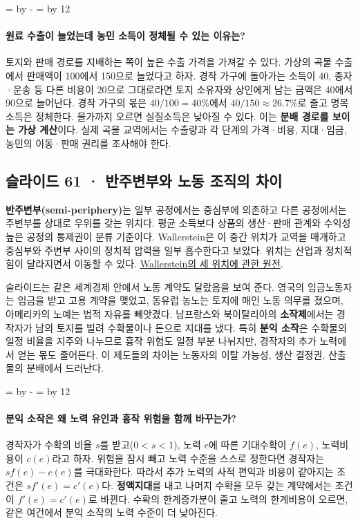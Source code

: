 \documentclass[10pt,a4paper]{article}
\newcommand{\ReserveQuestionSpace}{%
  \par\begingroup
  \dimen0=\pagegoal \advance\dimen0 by -\pagetotal
  \dimen2=\baselineskip \multiply\dimen2 by 12
  \ifdim\dimen0<\dimen2 \newpage\fi
  \endgroup}
\begin{document}
\ReserveQuestionSpace
\paragraph{원료 수출이 늘었는데 농민 소득이 정체될 수 있는 이유는?}
토지와 판매 경로를 지배하는 쪽이 높은 수출 가격을 가져갈 수 있다. 가상의 곡물 수출에서 판매액이 100에서 150으로 늘었다고 하자. 경작 가구에 돌아가는 소득이 40, 종자·운송 등 다른 비용이 20으로 그대로라면 토지 소유자와 상인에게 남는 금액은 40에서 90으로 늘어난다. 경작 가구의 몫은 $40/100=40\%$에서 $40/150\approx26.7\%$로 줄고 명목소득은 정체한다. 물가까지 오르면 실질소득은 낮아질 수 있다. 이는 \textbf{분배 경로를 보이는 가상 계산}이다. 실제 곡물 교역에서는 수출량과 각 단계의 가격·비용, 지대·임금, 농민의 이동·판매 권리를 조사해야 한다.\par

\subsection{슬라이드 61 · 반주변부와 노동 조직의 차이}
\textbf{반주변부(semi-periphery)}는 일부 공정에서는 중심부에 의존하고 다른 공정에서는 주변부를 상대로 우위를 갖는 위치다. 평균 소득보다 상품의 생산·판매 관계와 수익성 높은 공정의 통제권이 분류 기준이다. Wallerstein은 이 중간 위치가 교역을 매개하고 중심부와 주변부 사이의 정치적 압력을 일부 흡수한다고 보았다. 위치는 산업과 정치적 힘이 달라지면서 이동할 수 있다. \href{https://www.csub.edu/\%7Egsantos/WORLDSYS.HTML}{Wallerstein의 세 위치에 관한 원전}.\par

슬라이드는 같은 세계경제 안에서 노동 계약도 달랐음을 보여 준다. 영국의 임금노동자는 임금을 받고 고용 계약을 맺었고, 동유럽 농노는 토지에 매인 노동 의무를 졌으며, 아메리카의 노예는 법적 자유를 빼앗겼다. 남프랑스와 북이탈리아의 \textbf{소작제}에서는 경작자가 남의 토지를 빌려 수확물이나 돈으로 지대를 냈다. 특히 \textbf{분익 소작}은 수확물의 일정 비율을 지주와 나누므로 흉작 위험도 일정 부분 나뉘지만, 경작자의 추가 노력에서 얻는 몫도 줄어든다. 이 제도들의 차이는 노동자의 이탈 가능성, 생산 결정권, 산출물의 분배에서 드러난다.\par

\ReserveQuestionSpace
\paragraph{분익 소작은 왜 노력 유인과 흉작 위험을 함께 바꾸는가?}
경작자가 수확의 비율 $s$를 받고($0<s<1$), 노력 $e$에 따른 기대수확이 $f(e)$, 노력비용이 $c(e)$라고 하자. 위험을 잠시 빼고 노력 수준을 스스로 정한다면 경작자는 $sf(e)-c(e)$를 극대화한다. 따라서 추가 노력의 사적 편익과 비용이 같아지는 조건은 $sf'(e)=c'(e)$다. \textbf{정액지대}를 내고 나머지 수확을 모두 갖는 계약에서는 조건이 $f'(e)=c'(e)$로 바뀐다. 수확의 한계증가분이 줄고 노력의 한계비용이 오르면, 같은 여건에서 분익 소작의 노력 수준이 더 낮아진다.\par
\end{document}
